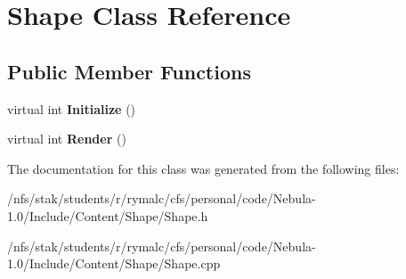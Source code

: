 \hypertarget{classShape}{
\section{Shape Class Reference}
\label{classShape}
}
\subsection*{Public Member Functions}
\begin{DoxyCompactItemize}
\item 
\hypertarget{classShape_a633bf116c08748538cabfc1b379a878a}{
virtual int {\bfseries Initialize} ()}
\label{classShape_a633bf116c08748538cabfc1b379a878a}

\item 
\hypertarget{classShape_a92fb5fbc2386e39c49bf3c77708fe5c6}{
virtual int {\bfseries Render} ()}
\label{classShape_a92fb5fbc2386e39c49bf3c77708fe5c6}

\end{DoxyCompactItemize}


The documentation for this class was generated from the following files:\begin{DoxyCompactItemize}
\item 
/nfs/stak/students/r/rymalc/cfs/personal/code/Nebula-\/1.0/Include/Content/Shape/Shape.h\item 
/nfs/stak/students/r/rymalc/cfs/personal/code/Nebula-\/1.0/Include/Content/Shape/Shape.cpp\end{DoxyCompactItemize}
